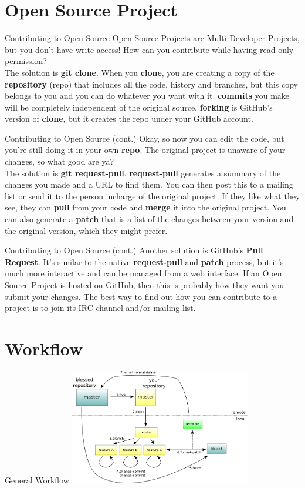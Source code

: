 \documentclass{beamer}
\begin{document}
\section{Open Source Project}

\begin{frame}{Contributing to Open Source}
  Open Source Projects are Multi Developer Projects, but you don't have write access! How can you contribute while having read-only permission?\\
    \pause
  The solution is \textbf{git clone}. When you \textbf{clone}, you are creating a copy of the \textbf{repository} (repo) that includes all the code, history and branches, but this copy belongs to you and you can do whatever you want with it. \textbf{commits} you make will be completely independent of the original source. \textbf{forking} is GitHub's version of \textbf{clone}, but it creates the repo under your GitHub account.
\end{frame}

\begin{frame}{Contributing to Open Source (cont.)}
  Okay, so now you can edit the code, but you're still doing it in your own \textbf{repo}. The original project is unaware of your changes, so what good are ya?\\
  
  \pause
  The solution is \textbf{git request-pull}. \textbf{request-pull} generates a summary of the changes you made and a URL to find them. You can then post this to a mailing list or send it to the person incharge of the original project. If they like what they see, they can \textbf{pull} from your code and \textbf{merge} it into the original project. You can also generate a \textbf{patch} that is a list of the changes between your version and the original version, which they might prefer.
  \end{frame}
  \begin{frame}{Contributing to Open Source (cont.)}
  Another solution is GitHub's \textbf{Pull Request}. It's similar to the native \textbf{request-pull} and \textbf{patch} process, but it's much more interactive and can be managed from a web interface. If an Open Source Project is hosted on GitHub, then this is probably how they want you submit your changes.
  \vfill
  \pause
  The best way to find out how you can contribute to a project is to join its IRC channel and/or mailing list.
\end{frame}


\section{Workflow}
\begin{frame}{General Workflow}
 \includegraphics[width=300px]{workflow.png}
\end{frame}
\end{document}
